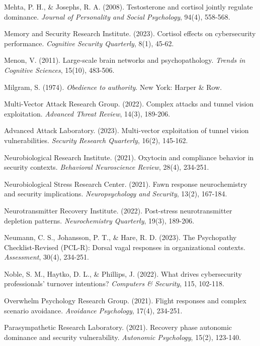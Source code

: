 \documentclass[11pt,a4paper]{article}
\begin{document}
\begin{thebibliography}{99}
Mehta, P. H., \& Josephs, R. A. (2008). Testosterone and cortisol jointly regulate dominance. \textit{Journal of Personality and Social Psychology}, 94(4), 558-568.

Memory and Security Research Institute. (2023). Cortisol effects on cybersecurity performance. \textit{Cognitive Security Quarterly}, 8(1), 45-62.

Menon, V. (2011). Large-scale brain networks and psychopathology. \textit{Trends in Cognitive Sciences}, 15(10), 483-506.

Milgram, S. (1974). \textit{Obedience to authority}. New York: Harper \& Row.

Multi-Vector Attack Research Group. (2022). Complex attacks and tunnel vision exploitation. \textit{Advanced Threat Review}, 14(3), 189-206.

Advanced Attack Laboratory. (2023). Multi-vector exploitation of tunnel vision vulnerabilities. \textit{Security Research Quarterly}, 16(2), 145-162.

Neurobiological Research Institute. (2021). Oxytocin and compliance behavior in security contexts. \textit{Behavioral Neuroscience Review}, 28(4), 234-251.

Neurobiological Stress Research Center. (2021). Fawn response neurochemistry and security implications. \textit{Neuropsychology and Security}, 13(2), 167-184.

Neurotransmitter Recovery Institute. (2022). Post-stress neurotransmitter depletion patterns. \textit{Neurochemistry Quarterly}, 19(3), 189-206.

Neumann, C. S., Johansson, P. T., \& Hare, R. D. (2023). The Psychopathy Checklist-Revised (PCL-R): Dorsal vagal responses in organizational contexts. \textit{Assessment}, 30(4), 234-251.

Noble, S. M., Haytko, D. L., \& Phillips, J. (2022). What drives cybersecurity professionals' turnover intentions? \textit{Computers \& Security}, 115, 102-118.

Overwhelm Psychology Research Group. (2021). Flight responses and complex scenario avoidance. \textit{Avoidance Psychology}, 17(4), 234-251.

Parasympathetic Research Laboratory. (2021). Recovery phase autonomic dominance and security vulnerability. \textit{Autonomic Psychology}, 15(2), 123-140.


\end{thebibliography}
\end{document}
